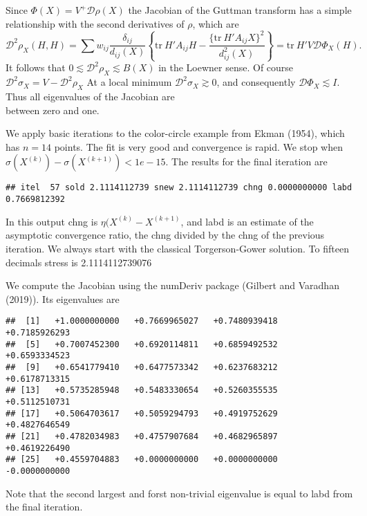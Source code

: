 \documentclass[
  12pt,
]{article}
\begin{document}
Since \(\Phi(X)=V^+\mathcal{D}\rho(X)\) the Jacobian of the Guttman transform
has a simple relationship with the second derivatives of \(\rho\), which are
\begin{equation}
\mathcal{D}^2\rho_X(H,H)=\sum w_{ij}\frac{\delta_{ij}}{d_{ij}(X)}\left\{\text{tr}\ H'A_{ij}H-\frac{\{\text{tr}\ H'A_{ij}X\}^2}{d_{ij}^2(X)}\right\}=\text{tr}\ H'V\mathcal{D}\Phi_X(H).
\label{eq:hessian}
\end{equation}
It follows that
\(0\lesssim\mathcal{D}^2\rho_X\lesssim B(X)\)
in the Loewner sense. Of course
\(\mathcal{D}^2\sigma_X=V-\mathcal{D}^2\rho_X\)
At a local minimum \(\mathcal{D}^2\sigma_X\gtrsim 0\), and consequently
\(\mathcal{D}\Phi_X\lesssim I\). Thus all eigenvalues of the Jacobian are\\
between zero and one.

We apply basic iterations to the color-circle example from Ekman (1954), which has
\(n=14\) points. The fit is very good and convergence is rapid. We stop when
\(\sigma(X^{(k)})-\sigma(X^{(k+1)})<1e-15\). The
results for the final iteration are

\begin{verbatim}
## itel  57 sold 2.1114112739 snew 2.1114112739 chng 0.0000000000 labd 0.7669812392
\end{verbatim}

In this output chng is \(\eta(X^{(k)}-X^{(k+1)}\), and labd is an estimate
of the asymptotic convergence ratio, the chng divided by the chng of the
previous iteration. We always start with the classical Torgerson-Gower
solution. To fifteen decimals stress is 2.1114112739076

We compute the Jacobian using the numDeriv package (Gilbert and Varadhan (2019)). Its eigenvalues are

\begin{verbatim}
##  [1]   +1.0000000000   +0.7669965027   +0.7480939418   +0.7185926293
##  [5]   +0.7007452300   +0.6920114811   +0.6859492532   +0.6593334523
##  [9]   +0.6541779410   +0.6477573342   +0.6237683212   +0.6178713315
## [13]   +0.5735285948   +0.5483330654   +0.5260355535   +0.5112510731
## [17]   +0.5064703617   +0.5059294793   +0.4919752629   +0.4827646549
## [21]   +0.4782034983   +0.4757907684   +0.4682965897   +0.4619226490
## [25]   +0.4559704883   +0.0000000000   +0.0000000000   -0.0000000000
\end{verbatim}

Note that the second largest and forst non-trivial
eigenvalue is equal to labd from the final iteration.
\end{document}

